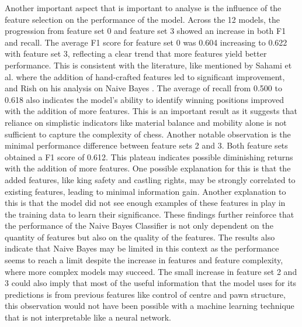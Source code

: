 Another important aspect that is important to analyse is the influence of the feature selection on the performance of the model. Across the 12 models, the progression from feature set 0 and feature set 3 showed an increase in both F1 and recall. The average F1 score for feature set 0 was 0.604 increasing to 0.622 with feature set 3, reflecting a clear trend that more features yield better performance. This is consistent with the literature, like mentioned by Sahami et al. \cite{sahamiBayesianApproachFiltering} where the addition of hand-crafted features led to significant improvement,  and Rish on his analysis on Naive Bayes \cite{rishEmpiricalStudyNaive}. The average of recall from 0.500 to 0.618 also indicates the model's ability to identify winning positions improved with the addition of more features. This is an important result as it suggests that reliance on simplistic indicators like material balance and mobility alone is not sufficient to capture the complexity of chess. Another notable observation is the minimal performance difference between feature sets 2 and 3. Both feature sets obtained a F1 score of 0.612. This plateau indicates possible diminishing returns with the addition of more features. One possible explanation for this is that the added features, like king safety and castling rights, may be strongly correlated to existing features, leading to minimal information gain. Another explanation to this is that the model did not see enough examples of these features in play in the training data to learn their significance. These findings further reinforce that the performance of the Naive Bayes Classifier is not only dependent on the quantity of features but also on the quality of the features. The results also indicate that Naive Bayes may be limited in this context as the performance seems to reach a limit despite the increase in features and feature complexity, where more complex models may succeed. The small increase in feature set 2 and 3 could also imply that most of the useful information that the model uses for its predictions is from previous features like control of centre and pawn structure, this observation would not have been possible with a machine learning technique that is not interpretable like a neural network. 


